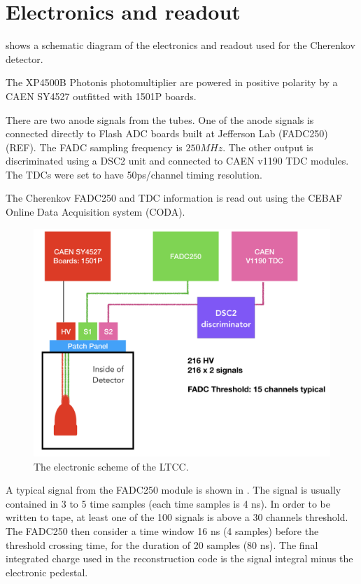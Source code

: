 \section{Electronics and readout}

 shows a schematic diagram of the electronics and readout used for the Cherenkov detector.

The XP4500B Photonis photomultiplier are powered in positive polarity by a CAEN SY4527 outfitted with 1501P boards.

There are two anode signals from the tubes. One of the anode signals is connected directly to Flash ADC
boards built at Jefferson Lab (FADC250)(REF). The FADC sampling frequency is $250 MHz$. The other output is discriminated using a DSC2 unit and connected to CAEN v1190 TDC modules.
The TDCs were set to have 50ps/channel timing resolution.

The Cherenkov FADC250 and TDC information is read out using the CEBAF Online Data Acquisition system (CODA).

\begin{figure}
	\centering
	\includegraphics[width=0.95\columnwidth,keepaspectratio]{img/electronicScheme.png}
	\caption{The electronic scheme of the LTCC.}
	\label{fig:electronicScheme}
\end{figure}





A typical signal from the FADC250 module is shown in . The signal is usually contained in 3 to 5 time samples (each time samples is 4 ns).
In order to be written to tape, at least one of the 100 signals is above a 30 channels threshold. The FADC250 then consider a time window 16 ns (4 samples)
before the threshold crossing time, for the duration of 20 samples (80 ns). The final integrated charge used in the reconstruction code is the signal integral
minus the electronic pedestal.



